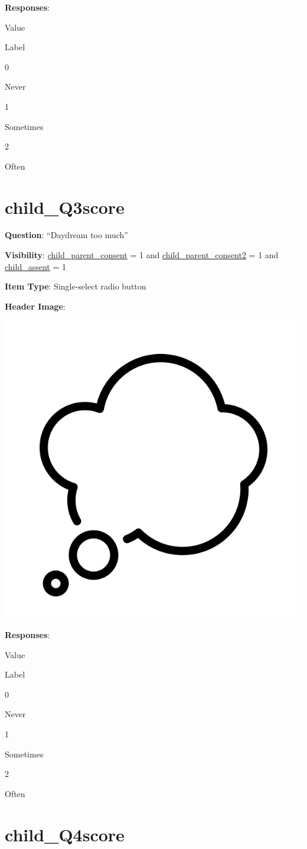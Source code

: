 \documentclass[]{book}
\begin{document}
\textbf{Responses}:

Value

Label

0

Never

1

Sometimes

2

Often

\hypertarget{child_q3score}{%
\section{child\_Q3score}\label{child_q3score}}

\textbf{Question}: ``Daydream too much''

\textbf{Visibility}: \protect\hyperlink{child_parent_consent}{child\_parent\_consent} = 1 and \protect\hyperlink{child_parent_consent2}{child\_parent\_consent2} = 1 and \protect\hyperlink{child_assent}{child\_assent} = 1

\textbf{Item Type}: Single-select radio button

\textbf{Header Image}:

\begin{flushleft}\includegraphics[width=0.33\linewidth]{downloadFigs4latex_HBN_PMHS_Codebook/child_Q3score_headerImg} \end{flushleft}

\textbf{Responses}:

Value

Label

0

Never

1

Sometimes

2

Often

\hypertarget{child_q4score}{%
\section{child\_Q4score}\label{child_q4score}}
\end{document}
